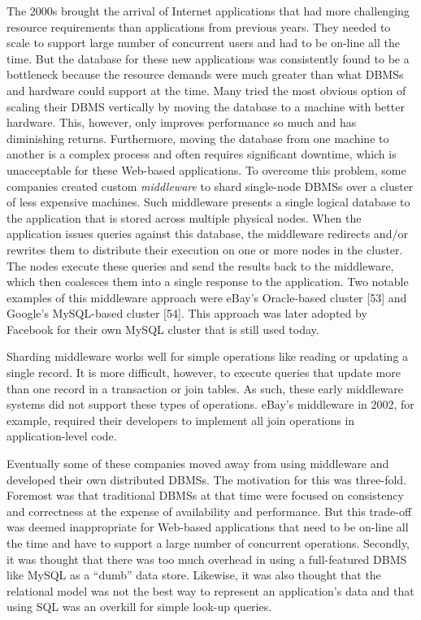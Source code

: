 \documentclass[a4paper,12pt,notitlepage,twoside,openright]{article}
\begin{document}
The 2000s brought the arrival of Internet applications that had more
challenging resource requirements than applications from previous years.
They needed to scale to support large number of concurrent users and had
to be on-line all the time. But the database for these new applications
was consistently found to be a bottleneck because the resource demands
were much greater than what DBMSs and hardware could support at the
time. Many tried the most obvious option of scaling their DBMS
vertically by moving the database to a machine with better hardware.
This, however, only improves performance so much and has diminishing
returns. Furthermore, moving the database from one machine to another is
a complex process and often requires significant downtime, which is
unacceptable for these Web-based applications. To overcome this problem,
some companies created custom \emph{middleware} to shard single-node
DBMSs over a cluster of less expensive machines. Such middleware
presents a single logical database to the application that is stored
across multiple physical nodes. When the application issues queries
against this database, the middleware redirects and/or rewrites them to
distribute their execution on one or more nodes in the cluster. The
nodes execute these queries and send the results back to the middleware,
which then coalesces them into a single response to the application. Two
notable examples of this middleware approach were eBay's Oracle-based
cluster {[}53{]} and Google's MySQL-based cluster {[}54{]}. This
approach was later adopted by Facebook for their own MySQL cluster that
is still used today.

Sharding middleware works well for simple operations like reading or
updating a single record. It is more difficult, however, to execute
queries that update more than one record in a transaction or join
tables. As such, these early middleware systems did not support these
types of operations. eBay's middleware in 2002, for example, required
their developers to implement all join operations in application-level
code.

Eventually some of these companies moved away from using middleware and
developed their own distributed DBMSs. The motivation for this was
three-fold. Foremost was that traditional DBMSs at that time were
focused on consistency and correctness at the expense of availability
and performance. But this trade-off was deemed inappropriate for
Web-based applications that need to be on-line all the time and have to
support a large number of concurrent operations. Secondly, it was
thought that there was too much overhead in using a full-featured DBMS
like MySQL as a ``dumb'' data store. Likewise, it was also thought that
the relational model was not the best way to represent an application's
data and that using SQL was an overkill for simple look-up queries.
\end{document}
